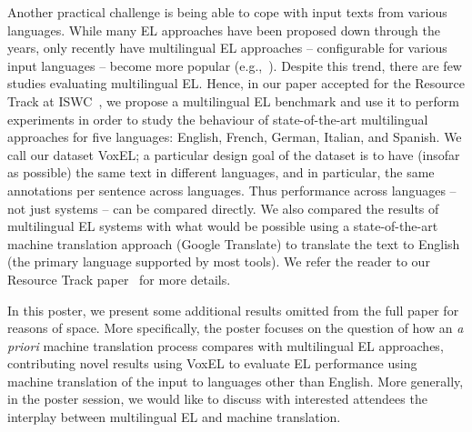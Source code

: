 \documentclass{llncs}
\begin{document}
Another practical challenge is being able to cope with input texts from various languages. While many EL approaches have been proposed down through the years, only recently have multilingual EL approaches -- configurable for various input languages -- become more popular (e.g.,~\cite{ferragina2010tagme,daiber2013improving,Babelfy-moro2014entity,freme-ner2016}). 
%
 Despite this trend, there are few studies evaluating multilingual EL. Hence, in our paper accepted for the Resource Track at ISWC~\cite{ourISWC}, we propose a multilingual EL benchmark and use it to perform experiments in order to study the behaviour of state-of-the-art multilingual approaches for five languages: English, French, German, Italian, and Spanish. We call our dataset VoxEL; a particular design goal of the dataset is to have (insofar as possible) the same text in different languages, and in particular, the same annotations per sentence across languages. Thus performance across languages -- not just systems -- can be compared directly. We also compared the results of multilingual EL systems with what would be possible using a state-of-the-art machine translation approach (Google Translate) to translate the text to English (the primary language supported by most tools). We refer the reader to our Resource Track paper~\cite{ourISWC} for more details.

In this poster, we present some additional results omitted from the full paper for reasons of space. More specifically, the poster focuses on the question of how an \textit{a priori} machine translation process compares with multilingual EL approaches, contributing novel results using VoxEL to evaluate EL performance using machine translation of the input to languages other than English. More generally, in the poster session, we would like to discuss with interested attendees the interplay between multilingual EL and machine translation.
\end{document}
